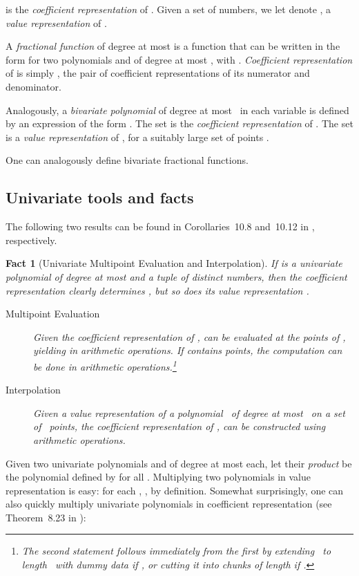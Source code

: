 \documentclass[11pt]{article}
\newtheorem{fact}[theorem]{Fact}
\theoremstyle{remark}
\begin{document}
is the \emph{coefficient representation} of .
Given a set  of  numbers, 
we let  denote
, a \emph{value representation} of .


A \emph{fractional function}  of degree at most  is a
function that can be written in the form  for two
polynomials  and  of degree at most , with .
\emph{Coefficient representation} of  is simply , the
pair of coefficient representations of its numerator and denominator.

Analogously, a \emph{bivariate polynomial } of degree at most~ in each variable is defined by an expression of the form
.  The set  is the \emph{coefficient representation} of
.
The set  is a \emph{value representation} of , for a suitably large set of points . 


One can analogously define bivariate fractional functions.

\subsection{Univariate tools and facts}
\label{sec:uni-tools}

The following two results can be found in Corollaries~10.8 and~10.12 in \cite{gg-mca-99}, respectively.

\begin{fact}[Univariate Multipoint Evaluation and Interpolation]
  \label{fact:eval-inter}
  If  is a univariate polynomial of degree at most  and  a tuple of  distinct numbers,  then the coefficient representation clearly determines , but so does its value representation .
  \begin{description}
  \item[Multipoint Evaluation] Given the coefficient representation
     of ,  can be evaluated at the  points of ,
    yielding  in  arithmetic
    operations.
If  contains  points, the computation can be done in  arithmetic operations.\footnote{The second statement follows immediately from the first by
      extending~ to length~ with dummy data if , or cutting
      it into chunks of length  if .}
  \item[Interpolation] Given a value representation  of a
    polynomial~ of degree at most~ on a set~ of~ points,
    the coefficient representation  of , can be constructed
    using  arithmetic operations.
\end{description}
\end{fact}

Given two univariate polynomials  and  of degree at most 
each, let their \emph{product}  be the polynomial  defined by  for all .  Multiplying two polynomials in
value representation is easy: for each , ,
by definition.  Somewhat surprisingly, one can also quickly multiply univariate polynomials in coefficient representation (see Theorem~8.23 in \cite{gg-mca-99}):
\end{document}
